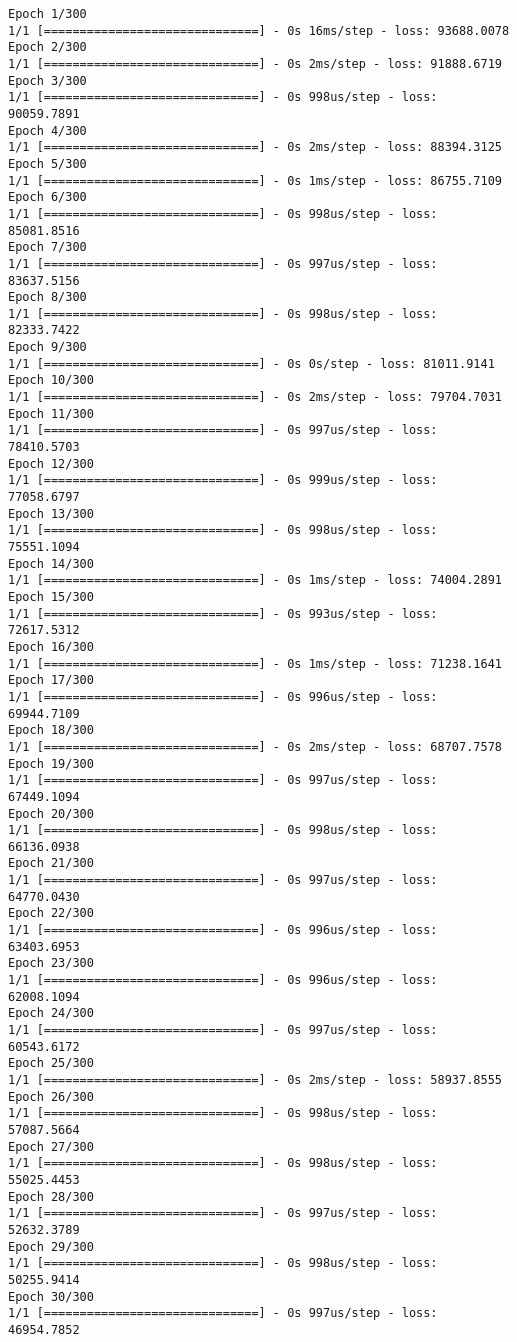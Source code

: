 \documentclass[11pt]{article}
\begin{document}
    \begin{Verbatim}[commandchars=\\\{\}]
Epoch 1/300
1/1 [==============================] - 0s 16ms/step - loss: 93688.0078
Epoch 2/300
1/1 [==============================] - 0s 2ms/step - loss: 91888.6719
Epoch 3/300
1/1 [==============================] - 0s 998us/step - loss: 90059.7891
Epoch 4/300
1/1 [==============================] - 0s 2ms/step - loss: 88394.3125
Epoch 5/300
1/1 [==============================] - 0s 1ms/step - loss: 86755.7109
Epoch 6/300
1/1 [==============================] - 0s 998us/step - loss: 85081.8516
Epoch 7/300
1/1 [==============================] - 0s 997us/step - loss: 83637.5156
Epoch 8/300
1/1 [==============================] - 0s 998us/step - loss: 82333.7422
Epoch 9/300
1/1 [==============================] - 0s 0s/step - loss: 81011.9141
Epoch 10/300
1/1 [==============================] - 0s 2ms/step - loss: 79704.7031
Epoch 11/300
1/1 [==============================] - 0s 997us/step - loss: 78410.5703
Epoch 12/300
1/1 [==============================] - 0s 999us/step - loss: 77058.6797
Epoch 13/300
1/1 [==============================] - 0s 998us/step - loss: 75551.1094
Epoch 14/300
1/1 [==============================] - 0s 1ms/step - loss: 74004.2891
Epoch 15/300
1/1 [==============================] - 0s 993us/step - loss: 72617.5312
Epoch 16/300
1/1 [==============================] - 0s 1ms/step - loss: 71238.1641
Epoch 17/300
1/1 [==============================] - 0s 996us/step - loss: 69944.7109
Epoch 18/300
1/1 [==============================] - 0s 2ms/step - loss: 68707.7578
Epoch 19/300
1/1 [==============================] - 0s 997us/step - loss: 67449.1094
Epoch 20/300
1/1 [==============================] - 0s 998us/step - loss: 66136.0938
Epoch 21/300
1/1 [==============================] - 0s 997us/step - loss: 64770.0430
Epoch 22/300
1/1 [==============================] - 0s 996us/step - loss: 63403.6953
Epoch 23/300
1/1 [==============================] - 0s 996us/step - loss: 62008.1094
Epoch 24/300
1/1 [==============================] - 0s 997us/step - loss: 60543.6172
Epoch 25/300
1/1 [==============================] - 0s 2ms/step - loss: 58937.8555
Epoch 26/300
1/1 [==============================] - 0s 998us/step - loss: 57087.5664
Epoch 27/300
1/1 [==============================] - 0s 998us/step - loss: 55025.4453
Epoch 28/300
1/1 [==============================] - 0s 997us/step - loss: 52632.3789
Epoch 29/300
1/1 [==============================] - 0s 998us/step - loss: 50255.9414
Epoch 30/300
1/1 [==============================] - 0s 997us/step - loss: 46954.7852

\end{Verbatim}
\end{document}
